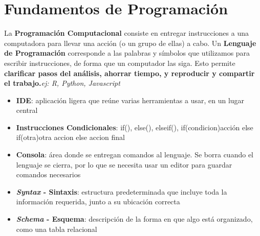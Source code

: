 
\section{Fundamentos de Programación}
La \textbf{Programación Computacional} consiste en entregar instrucciones a una computadora para llevar una acción (o un grupo de ellas) a cabo. Un \textbf{Lenguaje de Programación} corresponde a las palabras y símbolos que utilizamos para escribir instrucciones, de forma que un computador las siga. Esto permite \textbf{clarificar pasos del análisis, ahorrar tiempo, y reproducir y compartir el trabajo.}\textit{ej: R, Python, Javascript}
\begin{itemize}
    \item {\textbf{IDE}: aplicación ligera que reúne varias herramientas a usar, en un lugar central}
    \item {\textbf{Instrucciones Condicionales}: if(), else(), elseif(), if(condicion){acción} else if(otra){otra accion} else {accion final}}
    \item {\textbf{Consola}: área donde se entregan comandos al lenguaje. Se borra cuando el lenguaje se cierra, por lo que se necesita usar un editor para guardar comandos necesarios}
    \item {\textbf{\textit{Syntax} - Sintaxis}: estructura predeterminada que incluye toda la información requerida, junto a su ubicación correcta}
    \item {\textbf{\textit{Schema} - Esquema}: descripción de la forma en que algo está organizado, como una tabla relacional}
\end{itemize}

